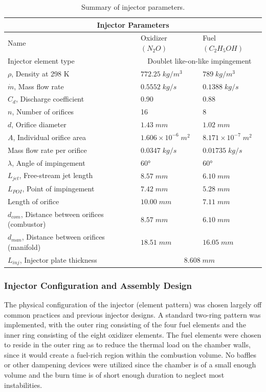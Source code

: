\documentclass[9pt]{article} %
\numberwithin{equation}{section} %
\begin{document}
\begin{table}[!htb]
\centering
\begin{tabular}{ |p{6.75cm}||p{2.75cm}|p{2.75cm}| }
\hline
\multicolumn{3}{|c|}{Injector Parameters} \\
\hline
Name & Oxidizer $(N_{2}O)$ & Fuel $(C_{2}H_{5}OH)$ \\ 
\hline
Injector element type & \multicolumn{2}{|c|}{Doublet like-on-like impingement}  \\
\hline
$\rho$, Density at 298 K  &  $772.25 \; kg/m^{3}$ &  $789 \; kg/m^{3}$  \\
$\dot{m}$, Mass flow rate & $0.5552 \; kg/s$ &  $0.1388 \; kg/s$ \\
$C_{d}$, Discharge coefficient & 0.90 & 0.88 \\
$n$, Number of orifices & 16 & 8 \\
$d$, Orifice diameter & $1.43 \; mm$ & $1.02 \; mm$ \\
$A$, Individual orifice area & $1.606 \times 10^{-6} \; m^{2}$ & $8.171 \times 10^{-7} \; m^{2}$ \\
Mass flow rate per orifice & $0.0347 \; kg/s$ & $0.01735 \; kg/s$ \\
$\lambda$, Angle of impingement & $\ang{60}$ & $\ang{60}$ \\
$L_{jet}$, Free-stream jet length & $8.57 \; mm$ & $6.10 \; mm$ \\
$L_{POI}$, Point of impingement & $7.42 \; mm$ & $5.28 \; mm$ \\
Length of orifice & $10.00 \; mm$ & $7.11 \; mm$ \\
$d_{com}$, Distance between orifices (combustor) & $8.57 \; mm$ & $6.10 \; mm$ \\
$d_{man}$, Distance between orifices (manifold) & $18.51 \; mm$ & $16.05 \; mm$ \\
\hline
$L_{inj}$, Injector plate thickness & \multicolumn{2}{|c|}{$8.608 \; mm$}  \\
\hline
\end{tabular}
\caption{Summary of injector parameters.}
\label{table:injector_parameters}
\end{table}

\subsubsection{Injector Configuration and Assembly Design}

\hspace{\parindent} The physical configuration of the injector (element pattern) was chosen largely off common practices and previous injector designs. A standard two-ring pattern was implemented, with the outer ring consisting of the four fuel elements and the inner ring consisting of the eight oxidizer elements. The fuel elements were chosen to reside in the outer ring as to reduce the thermal load on the chamber walls, since it would create a fuel-rich region within the combustion volume. No baffles or other dampening devices were utilized since the chamber is of a small enough volume and the burn time is of short enough duration to neglect most instabilities. 
\end{document}
